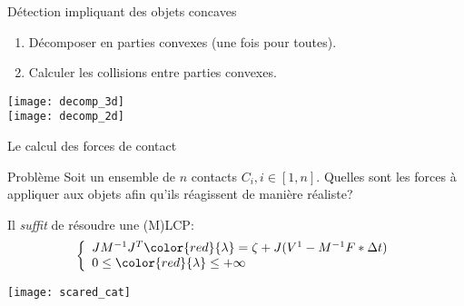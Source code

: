 \begin{frame}{Détection impliquant des objets concaves}
    \pause
    \begin{enumerate}
        \item Décomposer en parties convexes (une fois pour toutes).
        \item Calculer les collisions entre parties convexes.
    \end{enumerate}
    \begin{center}
        \texttt{[image: decomp\_3d]}\\
        \texttt{[image: decomp\_2d]}
    \end{center}
\end{frame}

\begin{frame}{Le calcul des forces de contact}
    \begin{block}{Problème}
         Soit un ensemble de $n$ contacts $C_i, i \in [1, n]$. Quelles sont les
         forces à appliquer aux objets afin qu’ils réagissent de manière
         réaliste?
    \end{block}
    \pause
    Il \textit{suffit} de résoudre une (M)LCP:
    \[
    \left\{
        \begin{array}{l}
            JM^{-1}J^T {\color{red}{\lambda}} = \zeta +
            J(V^1 - M^{-1}F * \Delta t)\\
            0 \leq {\color{red}{\lambda}} \leq +\infty %
        \end{array}
    \right.
    \]
    \begin{center}
        \texttt{[image: scared\_cat]}
    \end{center}
\end{frame}

